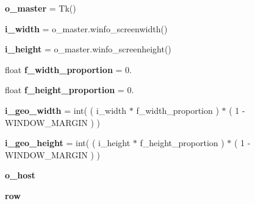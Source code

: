 \begin{DoxyCompactItemize}
\item 
{\bfseries o\+\_\+master} = Tk()\hypertarget{namespacenegui_1_1pghostnotebook_a87f3638cc6a59f9037d9f965f0f37538}{}\label{namespacenegui_1_1pghostnotebook_a87f3638cc6a59f9037d9f965f0f37538}

\item 
{\bfseries i\+\_\+width} = o\+\_\+master.\+winfo\+\_\+screenwidth()\hypertarget{namespacenegui_1_1pghostnotebook_abb662bea4c9bf9d4a5fe42c4fb4b4ed6}{}\label{namespacenegui_1_1pghostnotebook_abb662bea4c9bf9d4a5fe42c4fb4b4ed6}

\item 
{\bfseries i\+\_\+height} = o\+\_\+master.\+winfo\+\_\+screenheight()\hypertarget{namespacenegui_1_1pghostnotebook_abfedf6f0e0f6f989eba30fd49babff1d}{}\label{namespacenegui_1_1pghostnotebook_abfedf6f0e0f6f989eba30fd49babff1d}

\item 
float {\bfseries f\+\_\+width\+\_\+proportion} = 0.\hypertarget{namespacenegui_1_1pghostnotebook_a5ab5731364fab355fcdac3a12527a46a}{}\label{namespacenegui_1_1pghostnotebook_a5ab5731364fab355fcdac3a12527a46a}

\item 
float {\bfseries f\+\_\+height\+\_\+proportion} = 0.\hypertarget{namespacenegui_1_1pghostnotebook_adee69321e2e8b3e63c9d030880748c79}{}\label{namespacenegui_1_1pghostnotebook_adee69321e2e8b3e63c9d030880748c79}

\item 
{\bfseries i\+\_\+geo\+\_\+width} = int( ( i\+\_\+width $\ast$ f\+\_\+width\+\_\+proportion ) $\ast$ ( 1 -\/ W\+I\+N\+D\+O\+W\+\_\+\+M\+A\+R\+G\+IN ) )\hypertarget{namespacenegui_1_1pghostnotebook_a999255d83a1b5a0fa4eb9637eed7a597}{}\label{namespacenegui_1_1pghostnotebook_a999255d83a1b5a0fa4eb9637eed7a597}

\item 
{\bfseries i\+\_\+geo\+\_\+height} = int( ( i\+\_\+height $\ast$ f\+\_\+height\+\_\+proportion ) $\ast$ ( 1 -\/ W\+I\+N\+D\+O\+W\+\_\+\+M\+A\+R\+G\+IN ) )\hypertarget{namespacenegui_1_1pghostnotebook_a3f20501fe15d8b5209094a4faea61d0c}{}\label{namespacenegui_1_1pghostnotebook_a3f20501fe15d8b5209094a4faea61d0c}

\item 
{\bfseries o\+\_\+host}
\item 
{\bfseries row}\hypertarget{namespacenegui_1_1pghostnotebook_abbdb0eca27e7301cb04d4e404a1325e5}{}\label{namespacenegui_1_1pghostnotebook_abbdb0eca27e7301cb04d4e404a1325e5}


\end{DoxyCompactItemize}
